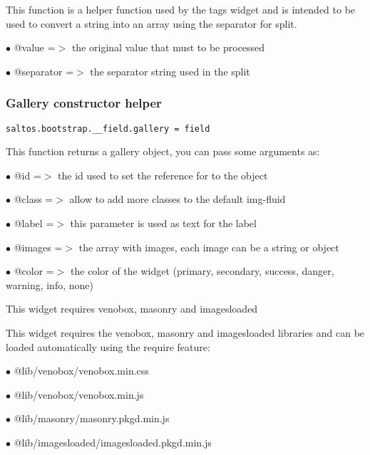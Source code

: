 \documentclass[a4paper]{article}
\begin{document}
This function is a helper function used by the tags widget and is intended
to be used to convert a string into an array using the separator for split.

\begin{compactitem}
\item[\color{myblue}$\bullet$] @value     =$>$ the original value that must to be processed
\item[\color{myblue}$\bullet$] @separator =$>$ the separator string used in the split
\end{compactitem}

\hypertarget{toc642}{}
\subsubsection{Gallery constructor helper}

\begin{lstlisting}
saltos.bootstrap.__field.gallery = field
\end{lstlisting}

This function returns a gallery object, you can pass some arguments as:

\begin{compactitem}
\item[\color{myblue}$\bullet$] @id     =$>$ the id used to set the reference for to the object
\item[\color{myblue}$\bullet$] @class  =$>$ allow to add more classes to the default img-fluid
\item[\color{myblue}$\bullet$] @label  =$>$ this parameter is used as text for the label
\item[\color{myblue}$\bullet$] @images =$>$ the array with images, each image can be a string or object
\item[\color{myblue}$\bullet$] @color  =$>$ the color of the widget (primary, secondary, success, danger, warning, info, none)
\end{compactitem}

This widget requires venobox, masonry and imagesloaded

This widget requires the venobox, masonry and imagesloaded libraries and can be loaded
automatically using the require feature:

\begin{compactitem}
\item[\color{myblue}$\bullet$] @lib/venobox/venobox.min.css
\item[\color{myblue}$\bullet$] @lib/venobox/venobox.min.js
\item[\color{myblue}$\bullet$] @lib/masonry/masonry.pkgd.min.js
\item[\color{myblue}$\bullet$] @lib/imagesloaded/imagesloaded.pkgd.min.js
\end{compactitem}
\end{document}
